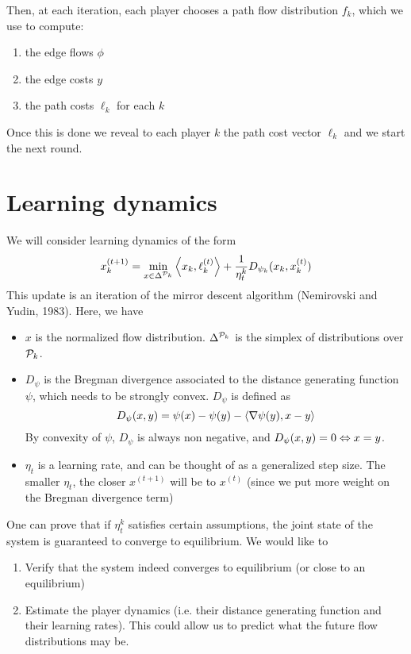 \documentclass[10pt,a4paper]{article}
\begin{document}
Then, at each iteration, each player chooses a path flow distribution $f_k$, which we use to compute:
\begin{enumerate}
\item the edge flows $\phi$
\item the edge costs $y$
\item the path costs $\ell_k$ for each $k$
\end{enumerate}

Once this is done we reveal to each player $k$ the path cost vector $\ell_k$ and we start the next round.

\section{Learning dynamics}

We will consider learning dynamics of the form
\[
x^{(t+1)}_k = \min_{x \in \Delta^{\mathcal{P}_k}} \left\langle x_k, \ell^{(t)}_k  \right\rangle + \frac{1}{\eta_t^k}D_{\psi_k}(x_k, x_k^{(t)})
\]
This update is an iteration of the mirror descent algorithm (Nemirovski and Yudin, 1983). Here, we have
\begin{itemize}
\item $x$ is the normalized flow distribution. $\Delta^{\mathcal{P}_k}$ is the simplex of distributions over $\mathcal{P}_k$.
\item $D_\psi$ is the Bregman divergence associated to the distance generating function $\psi$, which needs to be strongly convex. $D_\psi$ is defined as
\[
D_\psi(x, y) = \psi(x) - \psi(y) - \left\langle \nabla \psi(y), x - y \right\rangle
\]
By convexity of $\psi$, $D_\psi$ is always non negative, and $D_\psi(x, y) = 0 \Leftrightarrow x = y$.
\item $\eta_t$ is a learning rate, and can be thought of as a generalized step size. The smaller $\eta_t$, the closer $x^{(t+1)}$ will be to $x^{(t)}$ (since we put more weight on the Bregman divergence term)
\end{itemize}

One can prove that if $\eta_t^k$ satisfies certain assumptions, the joint state of the system is guaranteed to converge to equilibrium. We would like to
\begin{enumerate}
\item Verify that the system indeed converges to equilibrium (or close to an equilibrium)
\item Estimate the player dynamics (i.e. their distance generating function and their learning rates). This could allow us to predict what the future flow distributions may be.
\end{enumerate}
\end{document}

